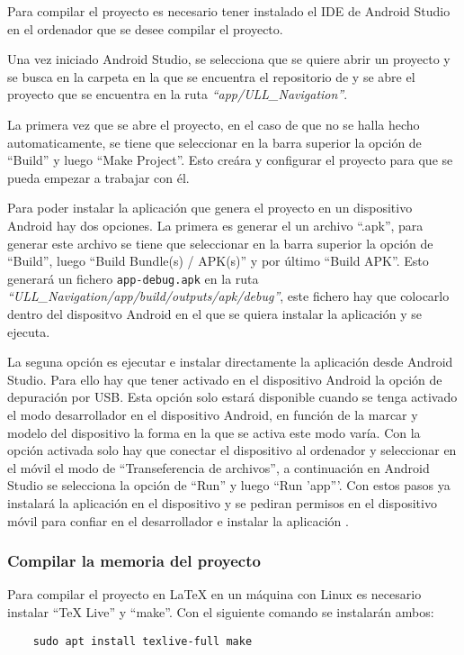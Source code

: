 Para compilar el proyecto es necesario tener instalado el IDE de Android Studio en el ordenador que se desee compilar el proyecto.

Una vez iniciado Android Studio, se selecciona que se quiere abrir un proyecto y se busca en la carpeta en la que se encuentra el repositorio de \ULLAR{} y se abre el proyecto que se encuentra en la ruta \textit{``app/ULL\_Navigation''}. 

La primera vez que se abre el proyecto, en el caso de que no se halla hecho automaticamente, se tiene  que seleccionar en la barra superior la opción de ``Build'' y luego ``Make Project''. Esto creára y configurar el proyecto para que se pueda empezar a trabajar con él.

Para poder instalar la aplicación que genera el proyecto en un dispositivo Android hay dos opciones. La primera es generar el un archivo ``.apk'', para generar este archivo se tiene que seleccionar en la barra superior la opción de ``Build'', luego ``Build Bundle(s) / APK(s)'' y por último ``Build APK''. Esto generará un fichero \texttt{app-debug.apk} en la ruta \textit{``ULL\_Navigation/app/build/outputs/apk/debug''}, este fichero hay que colocarlo dentro del dispositvo Android en el que se quiera instalar la aplicación y se ejecuta.

La seguna opción es ejecutar e instalar directamente la aplicación desde Android Studio. Para ello hay que tener activado en el dispositivo Android la opción de depuración por USB. Esta opción solo estará disponible cuando se tenga activado el modo desarrollador en el dispositivo Android, en función de la marcar y modelo del dispositivo la forma en la que se activa este modo varía. Con la opción activada solo hay que conectar el dispositivo al ordenador y seleccionar en el móvil el modo de ``Transeferencia de archivos'', a continuación en Android Studio se selecciona la opción de ``Run'' y luego ``Run 'app'''. Con estos pasos ya instalará la aplicación en el dispositivo y se pediran permisos en el dispositivo móvil para confiar en el desarrollador e instalar la aplicación \ULLAR{}. 


\subsubsection{Compilar la memoria del proyecto}

Para compilar el proyecto en LaTeX en un máquina con Linux es necesario instalar ``TeX Live'' y ``make''. Con el siguiente comando se instalarán ambos:
\begin{lstlisting}
    sudo apt install texlive-full make 
\end{lstlisting}

